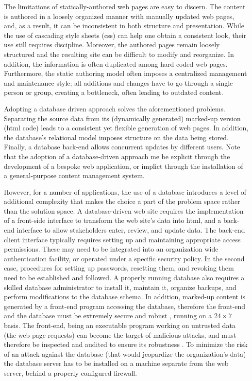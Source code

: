 \documentclass{elsart}
\begin{document}
The limitations of statically-authored web pages are easy to discern.
The content is authored in a loosely organized manner with
manually updated web pages, and, as a result,
it can be inconsistent in both structure and presentation.
While the use of cascading style sheets ({\sc css}) can help one obtain a
consistent look, their use still requires discipline.
Moreover, the authored pages remain loosely structured and the resulting
site can be difficult to modify and reorganize. In addition, the information is often duplicated
among hard coded web pages.
Furthermore, the static authoring model often imposes a centralized
management and maintenance style;
all additions and changes have to go through a single person or group,
creating a bottleneck, often leading to outdated content.

Adopting a database driven approach solves
the aforementioned problems.
Separating the source data from its (dynamically generated)
marked-up version ({\sc html} code) leads to a consistent
yet flexible generation of web pages.
In addition, the database's relational model imposes
structure on the data being stored.
Finally, a database back-end allows concurrent updates by
different users.
Note that the adoption of a database-driven approach me be
explicit through the development of a bespoke web application,
or implict through the installation of a general-purpose content
management system.


However, for a number of applications, the use of a database
introduces a level of additional complexity that
makes the choice a part of
the problem space rather than the solution space.
A database-driven web site requires the implementation of a
front-side interface to transform the web site's data into
{\sc html}, and a back-end interface to allow stakeholders
enter, review, and update data.
The back-end client interface typically requires setting up
and maintaining appropriate access permissions.
These may need to be integrated into an organization wide authentication 
facility, or operated under a specific security policy.
In the second case, procedures for setting up passwords,
resetting them, and revoking them need to be established and followed.
A properly running database also requires a skilled database
administrator to install it, maintain it, organize backups,
and perform modifications to the database schema.
In addition, marked-up content is generated by a front-end
program accessing the database, therefore the front-end and the database
must be extremely secure and robust \cite{VG01}, running on a $24 \times 7$ basis.
The front-end, being an executable program working on
untrusted data (the web page requests) can become the target of
malicious attacks,
and must therefore be inspected and audited to ensure its robustness \cite{YHDM04}.
To minimize the risk of an attack against the database
(that would jeopardize the organization's data)
the database server has to be installed on a machine separate
from the web server, behind a properly configured firewall.
\end{document}
